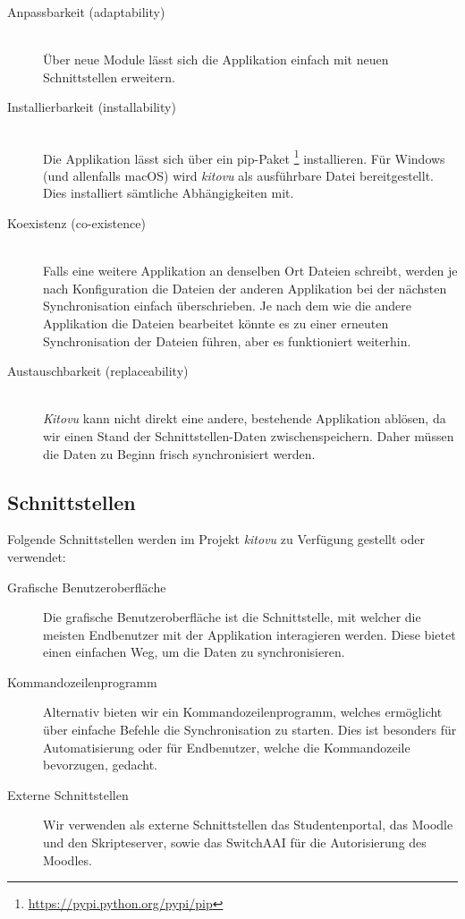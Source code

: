 \documentclass[a4paper]{article}
\begin{document}
\begin{description}
  \item[Anpassbarkeit (adaptability)] \strut \\
    Über neue Module lässt sich die Applikation einfach mit neuen Schnittstellen erweitern.
  \item[Installierbarkeit (installability)] \strut \\
    Die Applikation lässt sich über ein pip-Paket \footnote{\url{https://pypi.python.org/pypi/pip}} installieren. Für Windows (und allenfalls macOS) wird \emph{kitovu} als ausführbare Datei bereitgestellt.
    Dies installiert sämtliche Abhängigkeiten mit.
  \item[Koexistenz (co-existence)] \strut \\
    Falls eine weitere Applikation an denselben Ort Dateien schreibt, werden je nach Konfiguration die Dateien der anderen Applikation bei der nächsten Synchronisation einfach überschrieben.
    Je nach dem wie die andere Applikation die Dateien bearbeitet könnte es zu einer erneuten Synchronisation der Dateien führen, aber es funktioniert weiterhin.
  \item[Austauschbarkeit (replaceability)] \strut \\
    \emph{Kitovu} kann nicht direkt eine andere, bestehende Applikation ablösen, da wir einen Stand der Schnittstellen-Daten zwischenspeichern.
    Daher müssen die Daten zu Beginn frisch synchronisiert werden.
\end{description}

\subsection{Schnittstellen}

Folgende Schnittstellen werden im Projekt \emph{kitovu} zu Verfügung gestellt oder verwendet:

\begin{description}
  \item[Grafische Benutzeroberfläche]
    Die grafische Benutzeroberfläche ist die Schnittstelle, mit welcher die meisten Endbenutzer mit der Applikation interagieren werden.
    Diese bietet einen einfachen Weg, um die Daten zu synchronisieren.
  \item[Kommandozeilenprogramm]
    Alternativ bieten wir ein Kommandozeilenprogramm, welches ermöglicht über einfache Befehle die Synchronisation zu starten.
    Dies ist besonders für Automatisierung oder für Endbenutzer, welche die Kommandozeile bevorzugen, gedacht.
  \item[Externe Schnittstellen]
    Wir verwenden als externe Schnittstellen das Studentenportal, das Moodle und den Skripteserver, sowie das SwitchAAI für die Autorisierung des Moodles.
\end{description}
\end{document}
